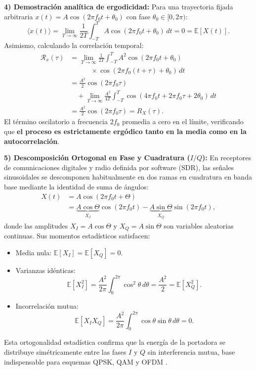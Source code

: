 \documentclass[conference]{IEEEtran}
\begin{document}
\textbf{4) Demostración analítica de ergodicidad:}
Para una trayectoria fijada arbitraria $x(t) = A\cos(2\pi f_0 t + \theta_0)$ con fase $\theta_0 \in [0, 2\pi)$:
\begin{equation}
\langle x(t) \rangle = \lim_{T \to \infty} \frac{1}{2T} \int_{-T}^{T} A\cos(2\pi f_0 t + \theta_0) \, dt = 0 = \mathbb{E}[X(t)].
\end{equation}
Asimismo, calculando la correlación temporal:
\begin{align}
\mathcal{R}_x(\tau) &= \lim_{T \to \infty} \frac{1}{2T} \int_{-T}^{T} A^2 \cos(2\pi f_0 t + \theta_0) \nonumber \\
&\qquad\quad \times \cos(2\pi f_0 (t+\tau) + \theta_0) \, dt \nonumber \\
&= \frac{A^2}{2}\cos(2\pi f_0 \tau) \nonumber \\
&\quad + \lim_{T \to \infty} \frac{A^2}{4T} \int_{-T}^{T} \cos(4\pi f_0 t + 2\pi f_0 \tau + 2\theta_0) \, dt \nonumber \\
&= \frac{A^2}{2}\cos(2\pi f_0 \tau) = R_X(\tau).
\label{eq:erg_demostracion}
\end{align}
El término oscilatorio a frecuencia $2f_0$ promedia a cero en el límite, verificando que \textbf{el proceso es estrictamente ergódico tanto en la media como en la autocorrelación}.

\textbf{5) Descomposición Ortogonal en Fase y Cuadratura ($I/Q$):}
En receptores de comunicaciones digitales y radio definida por software (SDR), las señales sinusoidales se descomponen habitualmente en dos ramas en cuadratura en banda base mediante la identidad de suma de ángulos:
\begin{align}
X(t) &= A \cos(2\pi f_0 t + \Theta) \nonumber \\
&= \underbrace{A \cos\Theta}_{X_I} \cos(2\pi f_0 t) - \underbrace{A \sin\Theta}_{X_Q} \sin(2\pi f_0 t),
\label{eq:descomposicion_iq}
\end{align}
donde las amplitudes $X_I = A\cos\Theta$ y $X_Q = A\sin\Theta$ son variables aleatorias continuas. Sus momentos estadísticos satisfacen:
\begin{itemize}
    \item Media nula: $\mathbb{E}[X_I] = \mathbb{E}[X_Q] = 0$.
    \item Varianzas idénticas:
    \begin{equation}
    \mathbb{E}[X_I^2] = \frac{A^2}{2\pi} \int_0^{2\pi} \cos^2\theta \, d\theta = \frac{A^2}{2} = \mathbb{E}[X_Q^2].
    \end{equation}
    \item Incorrelación mutua:
    \begin{equation}
    \mathbb{E}[X_I X_Q] = \frac{A^2}{2\pi} \int_0^{2\pi} \cos\theta \sin\theta \, d\theta = 0.
    \end{equation}
\end{itemize}
Esta ortogonalidad estadística confirma que la energía de la portadora se distribuye simétricamente entre las fases $I$ y $Q$ sin interferencia mutua, base indispensable para esquemas QPSK, QAM y OFDM \cite{proakis2008}.
\end{document}

